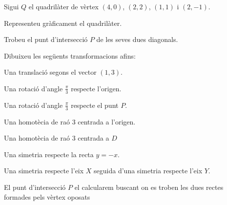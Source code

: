 \Exercise Sigui $Q$ el quadrilàter de vèrtex $(4,0)$, $(2,2)$, $(1,1)$ i $(2,-1)$.
\begin{llista}
  \item Representeu gràficament el quadrilàter.
  \item Trobeu el punt d'intersecció $P$ de les seves dues diagonals.
  \item Dibuixeu les següents transformacions afins:
  \begin{llista}
    \item Una translació segons el vector $(1,3)$.
    \item Una rotació d'angle $\frac{\pi}{3}$ respecte l'origen.
    \item Una rotació d'angle $\frac{\pi}{3}$ respecte el punt $P$.
    \item Una homotècia de raó 3 centrada a l'origen.
    \item Una homotècia de raó 3 centrada a $D$
    \item Una simetria respecte la recta $y=-x$.
    \item Una simetria respecte l'eix $X$ seguida d'una simetria respecte l'eix $Y$.
  \end{llista}
\end{llista}

\Answer El punt d'intersecció $P$ el calcularem buscant on es troben les dues rectes formades pels vèrtex oposats

\begin{center}
\end{center}

